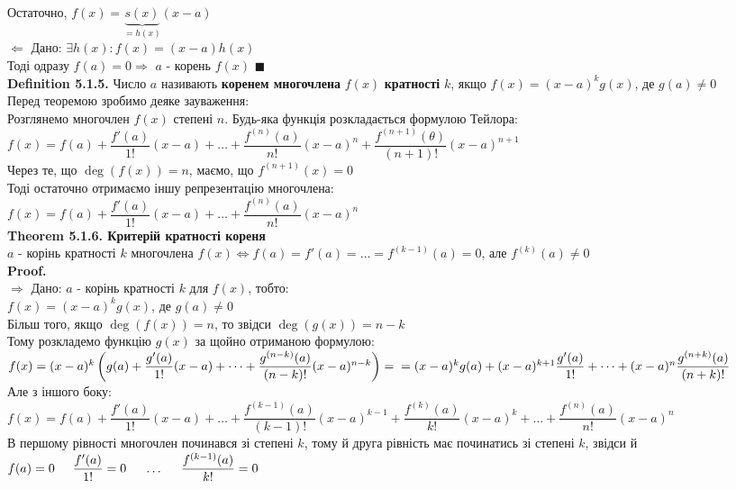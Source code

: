 \documentclass[a4paper, 14pt]{extarticle}
\def\defin#1{\textbf{Definition {#1}}}
\def\th#1{\textbf{Theorem {#1}}}
\def\proof{\textbf{Proof.}\\}
\def\bigline{\vspace{5mm}\\}
\def\qed{$\blacksquare$}
\begin{document}
Остаточно, $f(x) = \underbrace{s(x)}_{=h(x)}(x-a)$
\bigline
$\boxed{\Leftarrow}$ Дано: $\exists h(x): f(x) = (x-a)h(x)$\\
Тоді одразу $f(a) = 0 \Rightarrow$ $a$ - корень $f(x)$ \qed
\bigline
\defin{5.1.5.} Число $a$ називають \textbf{коренем многочлена} $f(x)$ \textbf{кратності} $k$, якщо $f(x) = (x-a)^k g(x)$, де $g(a) \neq 0$
\bigline
Перед теоремою зробимо деяке зауваження:\\
Розглянемо многочлен $f(x)$ степені $n$. Будь-яка функція розкладається формулою Тейлора:\\
$f(x) = f(a) + \dfrac{f'(a)}{1!}(x-a) + \dots + \dfrac{f^{(n)}(a)}{n!}(x-a)^n + \dfrac{f^{(n+1)}(\theta)}{(n+1)!}(x-a)^{n+1}$\\
Через те, що $\deg(f(x)) = n$, маємо, що $f^{(n+1)}(x) = 0$ \\ Тоді остаточно отримаємо іншу репрезентацію многочлена:\\
$f(x) = f(a) + \dfrac{f'(a)}{1!}(x-a) + \dots + \dfrac{f^{(n)}(a)}{n!}(x-a)^n$
\bigline
\th{5.1.6. Критерій кратності кореня}\\
$a$ - корінь кратності $k$ многочлена $f(x) \iff f(a)=f'(a)=\dots=f^{(k-1)}(a) =0$, але $f^{(k)}(a) \neq 0$\\
\proof
$\boxed{\Rightarrow}$ Дано: $a$ - корінь кратності $k$ для $f(x)$, тобто:\\
$f(x) = (x-a)^k g(x)$, де $g(a) \neq 0$\\
Більш того, якщо $\deg(f(x)) = n$, то звідси $\deg(g(x)) = n-k$\\
Тому розкладемо функцію $g(x)$ за щойно отриманою формулою:\\
$f(x) = (x-a)^k \left(g(a) + \dfrac{g'(a)}{1!}(x-a) + \dots + \dfrac{g^{(n-k)}(a)}{(n-k)!}(x-a)^{n-k} \right) = \\
= (x-a)^k g(a) + (x-a)^{k+1}\dfrac{g'(a)}{1!} + \dots + (x-a)^n\dfrac{g^{(n+k)}(a)}{(n+k)!}$\\
Але з іншого боку:\\
$f(x) = f(a) + \dfrac{f'(a)}{1!}(x-a) + \dots + \dfrac{f^{(k-1)}(a)}{(k-1)!}(x-a)^{k-1} + \dfrac{f^{(k)}(a)}{k!}(x-a)^{k} + \dots + \dfrac{f^{(n)}(a)}{n!}(x-a)^n$\\
В першому рівності многочлен починався зі степені $k$, тому й друга рівність має починатись зі степені $k$, звідси й\\
$f(a) = 0 \hspace{0.5 cm} \dfrac{f'(a)}{1!} = 0 \hspace{0.5 cm} \dots \hspace{0.5 cm} \dfrac{f^{(k-1)}(a)}{k!} = 0$\\
\end{document}
